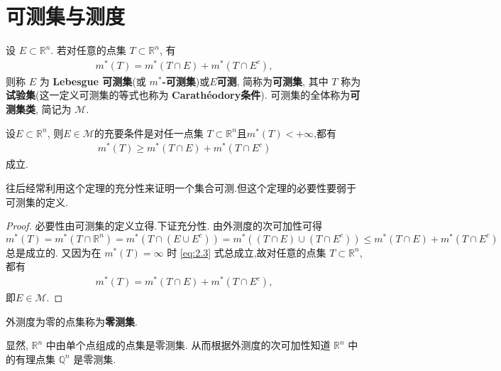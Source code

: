 \documentclass[../../main.tex]{subfiles}
\begin{document}
\section{可测集与测度}

\begin{definition}[可测集]
设 \(E \subset \mathbb{R}^n\). 若对任意的点集 \(T \subset \mathbb{R}^n\), 有
\begin{align*}
m^*(T)=m^*(T \cap E)+m^*(T \cap E^c), 
\end{align*}
则称 \(E\) 为 \textbf{Lebesgue 可测集}(或 \textbf{\(m^*\)-可测集})或$E$\textbf{可测}, 简称为\textbf{可测集}, 其中 \(T\) 称为\textbf{试验集}(这一定义可测集的等式也称为 \textbf{Carathéodory条件}). 可测集的全体称为\textbf{可测集类}, 简记为 \(\mathscr{M}\). 
\end{definition}

\begin{theorem}[集合可测的充要条件]\label{theorem:可测的充要条件}
设\(E\subset \mathbb{R}^n\), 则$E\in \mathscr{M}$的充要条件是对任一点集 \(T \subset \mathbb{R}^n\)且\(m^*(T)< + \infty\),都有
\begin{align}
m^*(T) \geq m^*(T \cap E)+m^*(T \cap E^c) \label{eq:2.3}
\end{align}
成立. 
\end{theorem}
\begin{remark}
往后经常利用这个定理的充分性来证明一个集合可测.但这个定理的必要性要弱于可测集的定义.
\end{remark}
\begin{proof}
必要性由可测集的定义立得.下证充分性.
由外测度的次可加性可得
\[
m^*(T)=m^*\left( T\cap \mathbb{R} ^n \right) =m^*\left( T\cap \left( E\cup E^c \right) \right) =m^*\left( \left( T\cap E \right) \cup \left( T\cap E^c \right) \right)  \leq m^*(T \cap E)+m^*(T \cap E^c)
\]
总是成立的. 又因为在 \(m^*(T)=\infty\) 时 \eqref{eq:2.3} 式总成立,故对任意的点集 \(T \subset \mathbb{R}^n\),都有
\begin{align*}
m^*(T)=m^*(T \cap E)+m^*(T \cap E^c), 
\end{align*}
即$E\in \mathscr{M}$.
\end{proof}

\begin{definition}[零测集]
外测度为零的点集称为\textbf{零测集}. 
\end{definition}
\begin{remark}
显然, \(\mathbb{R}^n\) 中由单个点组成的点集是零测集. 从而根据外测度的次可加性知道 \(\mathbb{R}^n\) 中的有理点集 \(\mathbb{Q}^n\) 是零测集.
\end{remark}
\end{document}
